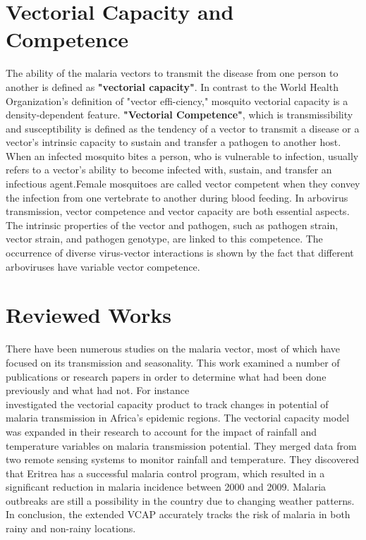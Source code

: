 \section{Vectorial Capacity and Competence}
The ability of the malaria vectors to transmit the disease from one person to another is defined as \textbf{"vectorial capacity"}. In contrast to the World Health Organization's definition of "vector effi-ciency," mosquito vectorial capacity is a density-dependent feature.
\textbf{"Vectorial Competence"}, which is transmissibility and susceptibility is defined as the tendency of a vector to transmit a disease or a vector's intrinsic capacity to sustain and transfer a pathogen to another host. When an infected mosquito bites a person, who is vulnerable to infection, usually refers to a vector's ability to become infected with, sustain, and transfer an infectious agent.Female mosquitoes are called vector competent when they convey the infection from one vertebrate to another during blood feeding. In arbovirus transmission, vector competence and vector capacity are both essential aspects. The intrinsic properties of the vector and pathogen, such as pathogen strain, vector strain, and pathogen genotype, are linked to this competence. The occurrence of diverse virus-vector interactions is shown by the fact that different arboviruses have variable vector competence.  

 
\textbf{}\section{Reviewed Works}
There have been numerous studies on the malaria vector, most of which have focused on its transmission and seasonality. This work examined a number of publications or research papers in order to determine what had been done previously and what had not. For instance\\

\noindent \cite{ceccato2012vectorial} investigated the vectorial capacity product to track changes in potential of malaria transmission in Africa's epidemic regions. The vectorial capacity model was expanded in their research to account for the impact of rainfall and temperature variables on malaria transmission potential. They merged data from two remote sensing systems to monitor rainfall and temperature. They discovered that Eritrea has a successful malaria control program, which resulted in a significant reduction in malaria incidence between 2000 and 2009. Malaria outbreaks are still a possibility in the country due to changing weather patterns. In conclusion, the extended VCAP accurately tracks the risk of malaria in both rainy and non-rainy locations.\\



